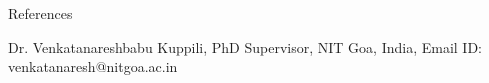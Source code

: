 
\prefix{}
\begin{rubric}{References}

{\large Dr. Venkatanareshbabu Kuppili, PhD Supervisor, NIT Goa, India, Email ID: venkatanaresh@nitgoa.ac.in\par}
\end{rubric}